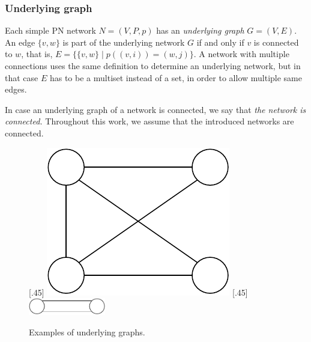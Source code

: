 \subsubsection{Underlying graph} \label{sec:underlying_graph}

Each simple PN network $N=(V,P,p)$ has an \emph{underlying graph} $G=(V,E)$.
An edge $\{v, w\}$ is part of the underlying network $G$ if and only if $v$ is connected to $w$, that is, $E = \{ \{v, w\} \mid  p((v, i)) = (w, j) \}$.
A network with multiple connections uses the same definition to determine an underlying network, but in that case $E$ has to be a multiset instead of a set, in order to allow multiple same edges.

In case an underlying graph of a network is connected, we say that \emph{the network is connected.}
Throughout this work, we assume that the introduced networks are connected.

\begin{figure}[H]
    [.45\linewidth] {
    \centering
    \includegraphics[scale=0.6]{diagrams/formalizing_pn_network_underlying_graph_1.pdf}
  }
  \hfill
    [.45\linewidth] {
    \centering
    \includegraphics[width=0.3\textwidth]{diagrams/formalizing_pn_network_underlying_graph_2.pdf}
  }
  \caption{Examples of underlying graphs.}
  \label{fig:underlying_graphs1}
\end{figure}


